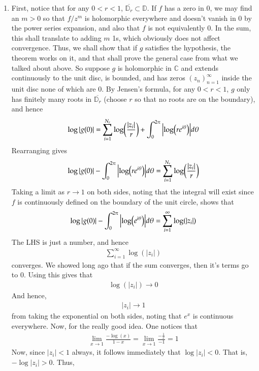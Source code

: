 \documentclass[12pt]{article}
\def\mbb#1{\mathbb{#1}}
\def \C{\mbb{C}}
\def \D{\mbb{D}}
\theoremstyle{definition}
\theoremstyle{remark}
\begin{document}
\begin{enumerate}[leftmargin=\labelsep]
	\item First, notice that for any $0 < r < 1$, $\overline{\D_r} \subset \D$. If $f$ has a zero in 0, we may find an $m > 0$ so that $f/z^m$ is holomorphic everywhere and doesn't vanish in 0 by the power series expansion, and also that $f$ is not equivalently 0. In the sum, this shall translate to adding $m$ 1s, which obviously does not affect convergence. Thus, we shall show that if $g$ satisfies the hypothesis, the theorem works on it, and that shall prove the general case from what we talked about above. So suppose $g$ is holomorphic in $\C$ and extends continuously to the unit disc, is bounded, and has zeros $(z_n)_{n=1}^\infty$ inside the unit disc none of which are 0. By Jensen's formula, for any $0 < r < 1$, $g$ only has finitely many roots in $\overline{\D_r}$ (choose $r$ so that no roots are on the boundary), and hence
	\begin{align*}
		\log |g(0)| = \sum_{i=1}^{N_r} \log(\frac{|z_i|}{r}) + \int_0^{2\pi} \qty|\log(re^{i\theta})|d\theta
	\end{align*}
	Rearranging gives
	\begin{align*}
		\log |g(0)| - \int_0^{2\pi} \qty|\log(re^{i\theta})|d\theta = \sum_{i=1}^{N_r} \log(\frac{|z_i|}{r})
	\end{align*}
	Taking a limit as $r \to 1$ on both sides, noting that the integral will exist since $f$ is continuously defined on the boundary of the unit circle, shows that 
	\begin{align*}
		\log |g(0)| - \int_0^{2\pi} \qty|\log(e^{i\theta})|d\theta = \sum_{i=1}^\infty \log(|z_i|)
	\end{align*}
	The LHS is just a number, and hence 
	\begin{align*}
		\sum_{i=1}^\infty \log(|z_i|)
	\end{align*}
	converges. We showed long ago that if the sum converges, then it's terms go to 0. Using this gives that
	\begin{align*}
		\log(|z_i|) \to 0
	\end{align*}
	And hence,
	\begin{align*}
		|z_i| \to 1
	\end{align*}
	from taking the exponential on both sides, noting that $e^x$ is continuous everywhere. Now, for the really good idea. One notices that
	\begin{align*}
		\lim_{x \to 1} \frac{-\log(x)}{1-x} = \lim_{x \to 1} \frac{-\frac1x}{-1} = 1
	\end{align*}
	Now, since $|z_i| < 1$ always, it follows immediately that $\log|z_i| < 0$. That is, $-\log|z_i| > 0$. Thus,

\end{enumerate}
\end{document}
